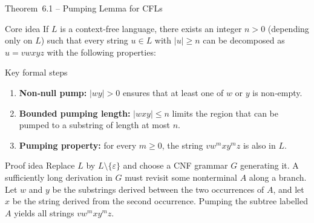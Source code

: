 \begin{frame}[t]{Theorem 6.1 – Pumping Lemma for CFLs}
  \begin{tblock}{Core idea}
    If $L$ is a context‑free language, there exists an integer $n>0$
    (depending only on $L$) such that every string $u \in L$ with
    $|u| \ge n$ can be decomposed as $u = v w x y z$ with the following
    properties:
  \end{tblock}
  \begin{tblock}{Key formal steps}
    \begin{enumerate}
      \item \textbf{Non‑null pump:} $|w y| > 0$ ensures that at least
        one of $w$ or $y$ is non‑empty.
      \item \textbf{Bounded pumping length:} $|w x y| \le n$ limits the
        region that can be pumped to a substring of length at most $n$.
      \item \textbf{Pumping property:} for every $m \ge 0$, the string
        $v w^m x y^m z$ is also in $L$.
    \end{enumerate}
  \end{tblock}
  \begin{tblock}{Proof idea}
    Replace $L$ by $L\setminus\{\varepsilon\}$ and choose a CNF
    grammar $G$ generating it.  A sufficiently long derivation in $G$
    must revisit some nonterminal $A$ along a branch.  Let $w$ and $y$
    be the substrings derived between the two occurrences of $A$, and let
    $x$ be the string derived from the second occurrence.  Pumping the
    subtree labelled $A$ yields all strings $v w^m x y^m z$.
  \end{tblock}
  \label{fr:6.1-05}
\end{frame}

